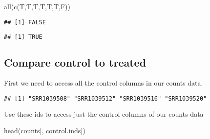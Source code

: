 \documentclass[
]{article}
\newenvironment{Shaded}{\begin{snugshade}}{\end{snugshade}}
\newcommand{\FunctionTok}[1]{\textcolor[rgb]{0.00,0.00,0.00}{#1}}
\newcommand{\NormalTok}[1]{#1}
\newcommand{\OtherTok}[1]{\textcolor[rgb]{0.56,0.35,0.01}{#1}}
\newcommand{\SpecialCharTok}[1]{\textcolor[rgb]{0.00,0.00,0.00}{#1}}
\newcommand{\StringTok}[1]{\textcolor[rgb]{0.31,0.60,0.02}{#1}}
\begin{document}
\begin{Shaded}
\begin{Highlighting}[]
\FunctionTok{all}\NormalTok{(}\FunctionTok{c}\NormalTok{(T,T,T,T,T,T,F))}
\end{Highlighting}
\end{Shaded}

\begin{verbatim}
## [1] FALSE
\end{verbatim}

\begin{Shaded}
\end{Shaded}

\begin{verbatim}
## [1] TRUE
\end{verbatim}

\hypertarget{compare-control-to-treated}{%
\subsection{Compare control to
treated}\label{compare-control-to-treated}}

First we need to access all the control columns in our counts data.

\begin{Shaded}
\end{Shaded}

\begin{verbatim}
## [1] "SRR1039508" "SRR1039512" "SRR1039516" "SRR1039520"
\end{verbatim}

Use these ids to access just the control columns of our counts data

\begin{Shaded}
\begin{Highlighting}[]
\FunctionTok{head}\NormalTok{(counts[, control.inds])}
\end{Highlighting}
\end{Shaded}
\end{document}

